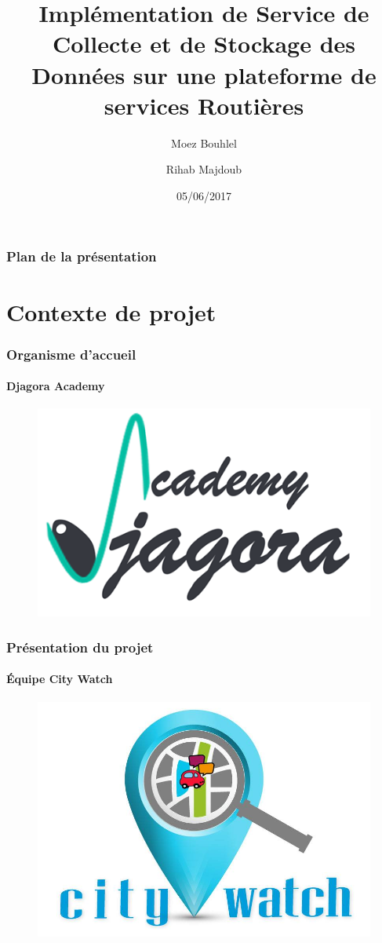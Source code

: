 \documentclass{beamer}
\title[Service Routière]{\textbf{Implémentation de Service de Collecte et de Stockage des Données sur une plateforme de services Routières}}
\author{Moez Bouhlel \and Rihab Majdoub}
\author[Moez B. \and Rihab M.]{\textbf {Moez Bouhlel \and Rihab Majdoub\\[0.2cm] \footnotesize Sous la direction de: \\ Dr. Mohamed Mhiri \and M. Mohamed Amri}}
\institute{Faculté des Sciences de Sfax}
\date{05/06/2017}
\begin{document}
{
    \frame{\titlepage}
}

\begin{frame}
    \frametitle{Plan de la présentation}
    \tableofcontents[hideallsubsections]
\end{frame}


\section{Contexte de projet}
\begin{frame}
\frametitle{Organisme d'accueil}
\framesubtitle{Djagora Academy}
\begin{figure}
    \includegraphics[width=.7\textwidth]{figures/logo-djagora.png}
\end{figure}
\end{frame}

\begin{frame}
    \frametitle{Présentation du projet}
    \framesubtitle{Équipe City Watch}
\begin{figure}
    \includegraphics[width=.6\textwidth]{figures/logo-citywatch.jpg}
\end{figure}
\end{frame}
\end{document}
